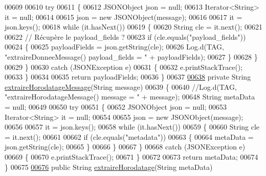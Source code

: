 \begin{DoxyCode}
{{{00609 
00610         \textcolor{keywordflow}{try}
00611         \{
00612             JSONObject json = null;
00613             Iterator<String> it = null;
00614 
00615             json = \textcolor{keyword}{new} JSONObject(message);
00616 
00617             it = json.keys();
00618             \textcolor{keywordflow}{while} (it.hasNext())
00619             \{
00620                 String cle = it.next();
00621 
00622                 \textcolor{comment}{// Récupère le payload\_fields ?}
00623                 \textcolor{keywordflow}{if} (cle.equals(\textcolor{stringliteral}{"payload\_fields"}))
00624                 \{
00625                     payloadFields = json.getString(cle);
00626                     Log.d(TAG, \textcolor{stringliteral}{"extraireDonneeMessage() payload\_fields = "} + payloadFields);
00627                 \}
00628             \}
00629         \}
00630         \textcolor{keywordflow}{catch} (JSONException e)
00631         \{
00632             e.printStackTrace();
00633         \}
00634 
00635         \textcolor{keywordflow}{return} payloadFields;
00636     \}
00637 
\hyperlink{classcom_1_1example_1_1bee__honeyt_1_1_i_h_m_mobile_aabe15decc02b7f56a82f60dac75f8c2f}{00638}     \textcolor{keyword}{private} String \hyperlink{classcom_1_1example_1_1bee__honeyt_1_1_i_h_m_mobile_aabe15decc02b7f56a82f60dac75f8c2f}{extraireHorodatageMessage}(String message)
00639     \{
00640         \textcolor{comment}{//Log.d(TAG, "extraireHorodatageMessage() message = " + message);}
00648 \textcolor{comment}{}        String metaData = null;
00649 
00650         \textcolor{keywordflow}{try}
00651         \{
00652             JSONObject json = null;
00653             Iterator<String> it = null;
00654 
00655             json = \textcolor{keyword}{new} JSONObject(message);
00656 
00657             it = json.keys();
00658             \textcolor{keywordflow}{while} (it.hasNext())
00659             \{
00660                 String cle = it.next();
00661 
00662                 \textcolor{keywordflow}{if} (cle.equals(\textcolor{stringliteral}{"metadata"}))
00663                 \{
00664                     metaData = json.getString(cle);
00665                 \}
00666             \}
00667         \}
00668         \textcolor{keywordflow}{catch} (JSONException e)
00669         \{
00670             e.printStackTrace();
00671         \}
00672 
00673         \textcolor{keywordflow}{return} metaData;
00674     \}
00675 
\hyperlink{classcom_1_1example_1_1bee__honeyt_1_1_i_h_m_mobile_ae14deb90573474bc46817312624ebd20}{00676}     \textcolor{keyword}{public} String \hyperlink{classcom_1_1example_1_1bee__honeyt_1_1_i_h_m_mobile_ae14deb90573474bc46817312624ebd20}{extraireHorodatage}(String metaData)
}}}
\end{DoxyCode}
